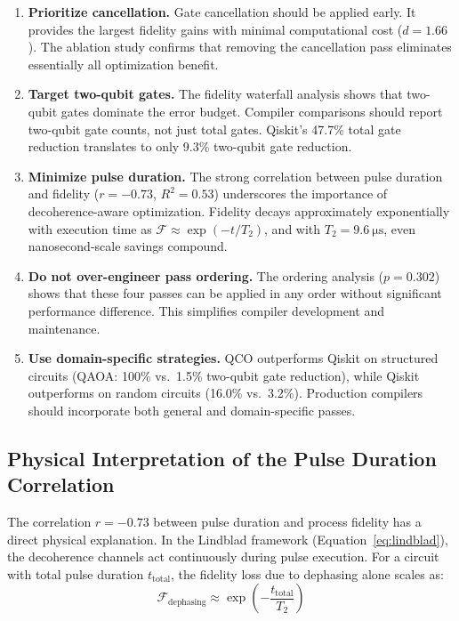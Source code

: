 \documentclass[sigconf,nonacm]{acmart}
\newcommand{\fid}{\mathcal{F}}
\begin{document}
\begin{enumerate}
    \item \textbf{Prioritize cancellation.} Gate cancellation should be applied early. It provides the largest fidelity gains with minimal computational cost ($d = 1.66$). The ablation study confirms that removing the cancellation pass eliminates essentially all optimization benefit.

    \item \textbf{Target two-qubit gates.} The fidelity waterfall analysis shows that two-qubit gates dominate the error budget. Compiler comparisons should report two-qubit gate counts, not just total gates. Qiskit's 47.7\% total gate reduction translates to only 9.3\% two-qubit gate reduction.

    \item \textbf{Minimize pulse duration.} The strong correlation between pulse duration and fidelity ($r = -0.73$, $R^2 = 0.53$) underscores the importance of decoherence-aware optimization. Fidelity decays approximately exponentially with execution time as $\fid \approx \exp(-t/T_2)$, and with $T_2 = \SI{9.6}{\micro\second}$, even nanosecond-scale savings compound.

    \item \textbf{Do not over-engineer pass ordering.} The ordering analysis ($p = 0.302$) shows that these four passes can be applied in any order without significant performance difference. This simplifies compiler development and maintenance.

    \item \textbf{Use domain-specific strategies.} QCO outperforms Qiskit on structured circuits (QAOA: 100\% vs.\ 1.5\% two-qubit gate reduction), while Qiskit outperforms on random circuits (16.0\% vs.\ 3.2\%). Production compilers should incorporate both general and domain-specific passes.
\end{enumerate}

\subsection{Physical Interpretation of the Pulse Duration Correlation}

The correlation $r = -0.73$ between pulse duration and process fidelity has a direct physical explanation. In the Lindblad framework (Equation~\ref{eq:lindblad}), the decoherence channels act continuously during pulse execution. For a circuit with total pulse duration $t_{\text{total}}$, the fidelity loss due to dephasing alone scales as:
\begin{equation}
    \fid_{\text{dephasing}} \approx \exp\left(-\frac{t_{\text{total}}}{T_2}\right)
    \label{eq:dephasing}
\end{equation}
\end{document}
